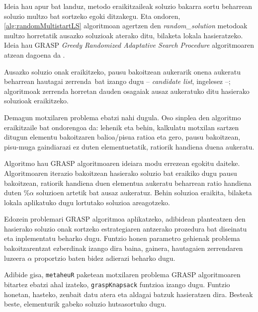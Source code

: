 \documentclass[eu]{ifirak}\usepackage[]{graphicx}\usepackage[]{color}
\newcommand{\zkk}{\guillemotleft}
\newcommand{\skk}{\guillemotright}
\newcommand{\code}[1]{\texttt{#1}}
\begin{document}
Ideia hau apur bat landuz, metodo eraikitzaileak soluzio bakarra sortu beharrean soluzio multzo bat sortzeko egoki ditzakegu. Eta ondoren, \ref{alg:randomMultistartLS} algoritmoan agertzen den \textit{random\_solution} metodoak multzo horretatik ausazko soluzioak aterako ditu, bilaketa lokala hasieratzeko. Ideia hau GRASP \textit{Greedy Randomized Adaptative Search Procedure} algoritmoaren atzean dagoena da \cite{feo1989}.

Ausazko soluzio onak eraikitzeko, pausu bakoitzean aukerarik onena aukeratu beharrean \zkk hautagai zerrenda\skk\ bat izango dugu -- \textit{candidate list}, ingelesez --; algoritmoak zerrenda horretan dauden osagaiak ausaz aukeratuko ditu hasierako soluzioak eraikitzeko.

\begin{tcolorbox}
\begin{ifexample}
Demagun motxilaren problema ebatzi nahi dugula. Oso sinplea den algoritmo eraikitzaile bat ondorengoa da: lehenik eta behin, kalkulatu motxilan sartzen ditugun elementu bakoitzaren balioa/pisua ratioa eta gero, pausu bakoitzean, pisu-muga gaindiarazi ez duten elementuetatik, ratiorik handiena duena aukeratu. 

Algoritmo hau GRASP algoritmoaren ideiara modu errezean egokitu daiteke. Algoritmoaren iterazio bakoitzean hasierako soluzio bat eraikiko dugu pausu bakoitzean, ratiorik handiena duen elementua aukeratu beharrean ratio handiena duten $\%\alpha$ soluzioen artetik bat ausaz aukeratuz. Behin soluzioa eraikita, bilaketa lokala aplikatuko dugu lortutako soluzioa areagotzeko. 
\end{ifexample}
\end{tcolorbox}

Edozein problemari GRASP algoritmoa aplikatzeko, adibidean planteatzen den hasierako soluzio onak sortzeko estrategiaren antzerako prozedura bat diseinatu eta inplementatu beharko dugu. Funtzio honen parametro gehienak problema bakoitzarentzat ezberdinak izango dira baina, gainera, hautagaien zerrendaren luzeera $\alpha$ proportzio baten bidez adierazi beharko dugu. 

Adibide gisa, \code{metaheuR} paketean motxilaren problema GRASP algoritmoaren bitartez ebatzi ahal izateko, \code{graspKnapsack} funtzioa izango dugu. Funtzio honetan, hasteko, zenbait datu atera eta aldagai batzuk hasieratzen dira. Besteak beste, elementurik gabeko soluzio \zkk hutsa\skk sortuko dugu.
\end{document}
